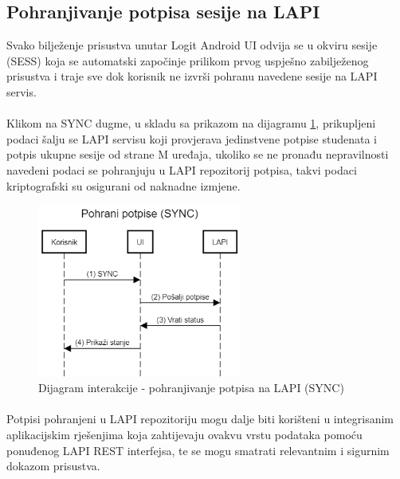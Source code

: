 \subsection*{Pohranjivanje potpisa sesije na LAPI}
Svako bilježenje prisustva unutar Logit Android UI odvija se u okviru sesije (SESS) koja se automatski započinje prilikom prvog uspješno zabilježenog prisustva i traje sve dok korisnik ne izvrši pohranu navedene sesije na LAPI servis.

\paragraph*{}
Klikom na SYNC dugme, u skladu sa prikazom na dijagramu \ref{fig:int_dia_sync}, prikupljeni podaci šalju se LAPI servisu koji provjerava jedinstvene potpise studenata i potpis ukupne sesije od strane M uređaja, ukoliko se ne pronađu nepravilnosti navedeni podaci se pohranjuju u LAPI repozitorij potpisa, takvi podaci kriptografski su osigurani od naknadne izmjene.

\begin{figure}[H]
    \centering
    \includegraphics[width=0.6\textwidth]{material/dia/04_sync}
    \caption{Dijagram interakcije - pohranjivanje potpisa na LAPI (SYNC)}
    \label{fig:int_dia_sync}
\end{figure}
\paragraph*{}
Potpisi pohranjeni u LAPI repozitoriju mogu dalje biti korišteni u integrisanim aplikacijskim rješenjima koja zahtijevaju ovakvu vrstu podataka pomoću ponuđenog LAPI REST interfejsa, te se mogu smatrati relevantnim i sigurnim dokazom prisustva.

